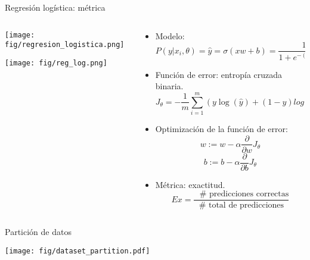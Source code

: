 \documentclass[aspectratio=169,9pt]{beamer}
\begin{document}
\begin{frame}{Regresión logística: métrica}
	\begin{columns}
		\begin{column}{0.55\textwidth}
		\begin{flushleft}
		\texttt{[image: fig/regresion\_logistica.png]}
		\end{flushleft}
		\texttt{[image: fig/reg\_log.png]}
		\end{column}
		\begin{column}{0.55\textwidth}
			\begin{itemize}
				\item Modelo:
				\begin{equation*}
				P(y|x_i,\theta) = \hat{y}= \sigma(xw + b) =\frac{1}{1 + e^{-(xw + b)}}
				\end{equation*}
				\item Función de error: entropía cruzada binaria.
				\begin{equation*}	
					J_\theta = - \frac{1}{m} \sum_{i=1}^{m} (y \log(\hat{y})+(1-y)log(1-\hat{y})) 
				\end{equation*}
				\item Optimización de la función de error:
				\begin{equation*}
					w := w  - \alpha \frac{\partial}{\partial w} J_\theta
				\end{equation*}		
				\begin{equation*}
					b := b  - \alpha \frac{\partial}{\partial b} J_\theta
				\end{equation*}
				\item Métrica: exactitud. 
				\begin{equation*}
					Ex = \frac{\text{ $\#$ predicciones correctas}}{\text{$\#$ total de predicciones}}
				\end{equation*}					
			\end{itemize}
			
		\end{column}
	\end{columns}
\end{frame}

\begin{frame}{Partición de datos}
	\begin{center}
		\texttt{[image: fig/dataset\_partition.pdf]}
	\end{center}
\end{frame}
\end{document}
